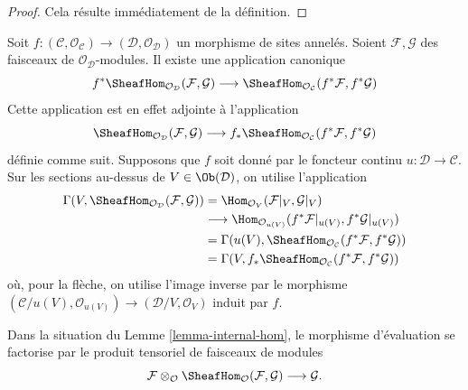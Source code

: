 \begin{proof}
Cela résulte immédiatement de la définition.
\end{proof}

\begin{remark}
\label{remark-pullback-internal-hom}
Soit $f : (\mathcal{C}, \mathcal{O}_\mathcal{C}) \to
(\mathcal{D}, \mathcal{O}_\mathcal{D})$ un morphisme de sites annelés.
Soient $\mathcal{F}, \mathcal{G}$ des faisceaux de
$\mathcal{O}_\mathcal{D}$-modules. Il existe une application canonique
$$
f^*\SheafHom_{\mathcal{O}_\mathcal{D}}(\mathcal{F}, \mathcal{G})
\longrightarrow
\SheafHom_{\mathcal{O}_\mathcal{C}}(f^*\mathcal{F}, f^*\mathcal{G})
$$
Cette application est en effet adjointe à l'application
$$
\SheafHom_{\mathcal{O}_\mathcal{D}}(\mathcal{F}, \mathcal{G})
\longrightarrow
f_*\SheafHom_{\mathcal{O}_\mathcal{C}}(f^*\mathcal{F}, f^*\mathcal{G})
$$
définie comme suit. Supposons que $f$ soit donné par le foncteur continu
$u : \mathcal{D} \to \mathcal{C}$. Sur les sections au-dessus de
$V \in \Ob(\mathcal{D})$, on utilise l'application
\begin{align*}
\Gamma(V, \SheafHom_{\mathcal{O}_\mathcal{D}}(\mathcal{F}, \mathcal{G}))
& =
\Hom_{\mathcal{O}_V}(\mathcal{F}|_V, \mathcal{G}|_V) \\
& \longrightarrow
\Hom_{\mathcal{O}_{u(V)}}(f^*\mathcal{F}|_{u(V)}, f^*\mathcal{G}|_{u(V)}) \\
& =
\Gamma(u(V), \SheafHom_{\mathcal{O}_\mathcal{C}}(f^*\mathcal{F},
f^*\mathcal{G})) \\
& =
\Gamma(V, f_*\SheafHom_{\mathcal{O}_\mathcal{C}}(f^*\mathcal{F},
f^*\mathcal{G}))
\end{align*}
où, pour la flèche, on utilise l'image inverse par le morphisme
$(\mathcal{C}/u(V), \mathcal{O}_{u(V)}) \to
(\mathcal{D}/V, \mathcal{O}_V)$ induit par $f$.
\end{remark}

\noindent
Dans la situation du Lemme \ref{lemma-internal-hom}, le morphisme
d'évaluation se factorise par le produit tensoriel de faisceaux de
modules
$$
\mathcal{F}
\otimes_\mathcal{O}
\SheafHom_\mathcal{O}(\mathcal{F}, \mathcal{G})
\longrightarrow
\mathcal{G}.
$$

